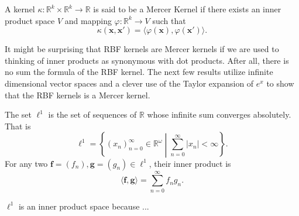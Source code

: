 \begin{definition}
    A kernel $\kappa: \mathbb{R}^{k} \times \mathbb{R}^{k} \to \mathbb{R}$
    is said to be a Mercer Kernel if there exists an inner product space
    $V$ and mapping $\varphi: \mathbb{R}^{k} \to V$ such that
    \begin{equation*}
        \kappa(\mathbf{x}, \mathbf{x}') = \langle \varphi(\mathbf{x}), \varphi(\mathbf{x}') \rangle.
    \end{equation*}
\end{definition}

It might be surprising that RBF kernels are Mercer kernels if we are used to thinking of inner products as synonymous with dot products.
After all, there is no sum the formula of the RBF kernel.
The next few results utilize infinite dimensional vector spaces and a clever use of the Taylor expansion of $e^{x}$ to show that the RBF kernels is a Mercer kernel.

\begin{definition}[$\ell^1$]
    The set $\ell^{1}$ is the set of sequences of $\mathbb{R}$ whose infinite sum converges absolutely.
    That is
    \begin{equation*}
        \ell^{1} = \left\{ (x_n)_{n=0}^{\infty} \in \mathbb{R}^{\omega} \middle| \sum_{n=0}^{\infty} \lvert x_n \rvert < \infty \right\}.
    \end{equation*}
    For any two $\mathbf{f} = (f_n), \mathbf{g} = (g_n) \in \ell^{1}$, their inner product is
    \begin{equation*}
        \langle \mathbf{f}, \mathbf{g} \rangle = \sum\limits_{n=0}^{\infty} f_ng_n.
    \end{equation*}
\end{definition}
$\ell^{1}$ is an inner product space because ...

